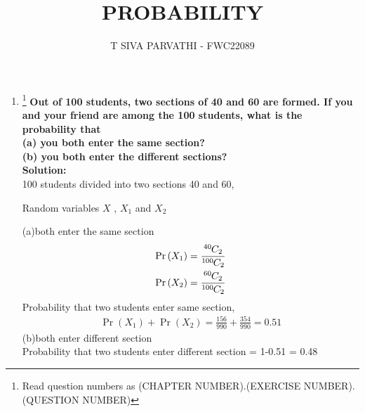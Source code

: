 \documentclass{article}
\providecommand{\pr}[1]{\ensuremath{\Pr\left(#1\right)}}
\newcommand{\solution}{\noindent \textbf{Solution: }}
\newcommand*{\permcomb}[4][0mu]{{{}^{#3}\mkern#1#2_{#4}}}
\newcommand*{\comb}[1][-1mu]{\permcomb[#1]{C}}
\begin{document}
\title{PROBABILITY}
\author{\Large T SIVA PARVATHI - FWC22089}
\date{}

\maketitle
\begin{enumerate}[label=16.\arabic{enumi}.\arabic{enumii}]%
\setcounter{enumi}{3}
\setcounter{enumii}{5}

\item \footnote{Read question numbers as (CHAPTER NUMBER).(EXERCISE NUMBER).(QUESTION NUMBER)}
\textbf {Out of 100 students, two sections of 40 and 60 are formed. If you and your friend are among the 100 students, what is the probability that\\
(a) you both enter the same section?\\
(b) you both enter the different sections?}\\[1ex]

\solution\\
100 students divided into two sections 40 and 60,
\begin{table}[h]
	
	 \caption{Random variables $X$ , $X_1$ and $X_2$}\label{table:1}
\end{table}

(a)both enter the same section\\
\begin{align}
\pr{X_1} = \frac{\comb{40}{2}} {\comb{100}{2}}\\
\pr{X_2} = \frac{\comb{60}{2}} {\comb{100}{2}}
\end{align}
Probability that two students enter same section,\\
\begin{align}
\pr{X_1}+\pr{X_2} = \frac{156}{990}+\frac{354}{990} = 0.51
\end{align}
(b)both enter different section\\
Probability that two students enter different section = 1-0.51 = 0.48
\end{enumerate}
\end{document}
